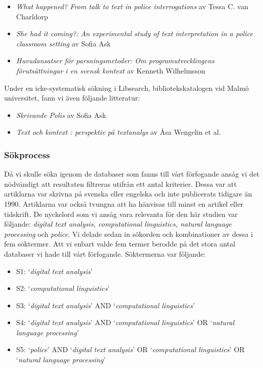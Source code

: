 \documentclass[swedish]{maucsthesis}
\begin{document}
\begin{itemize}
\item \textit{What happened? From talk to text in police interrogations} av
  Tessa C. van Charldorp
\item \textit{She had it coming?: An experimental study of text interpretation
    in a police classroom setting} av Sofia Ask
\item \textit{Huvudansatser för parsningsmetoder: Om programutvecklingens
    förutsättningar i en svensk kontext} av Kenneth Wilhelmsson
\end{itemize}

Under en icke-systematisk sökning i Libsearch, bibliotekskatalogen vid Malmö
universitet, fann vi även följande litteratur:

\begin{itemize}
\item \textit{Skrivande Polis} av Sofia Ask
\item \textit{Text och kontext : perspektiv på textanalys} av Åsa Wengelin et al.
\end{itemize}

\subsubsection{Sökprocess}

Då vi skulle söka igenom de databaser som fanns till vårt förfogande ansåg vi
det nödvändigt att resultaten filtreras utifrån ett antal kriterier. Dessa var
att artiklarna var skrivna på svenska eller engelska och inte publicerats
tidigare än 1990. Artiklarna var också tvungna att ha hänvisas till minst en
artikel eller tidskrift. De nyckelord som vi ansåg vara relevanta för den här
studien var följande: \textit {digital text analysis, computational linguistics, natural
language processing} och \textit {police}. Vi delade sedan in sökorden och kombinationer av
dessa i fem söktermer. Att vi enbart valde fem termer berodde på det stora antal
databaser vi hade till vårt förfogande. Söktermerna var följande:

\begin{itemize}
\item S1: ‘\textit{digital text analysis}’
\item S2: ‘\textit{computational linguistics}’
\item S3: ‘\textit{digital text analysis}’ AND ‘\textit{computational
    linguistics}’
\item S4: ‘\textit{digital text analysis}’ AND ‘\textit{computational
    linguistics}’ OR ‘\textit{natural language processing}’
\item S5: ‘\textit{police}’ AND ‘\textit{digital text analysis}’ OR
  ‘\textit{computational linguistics}’ OR ‘\textit{natural language processing}’
\end{itemize}
\end{document}
